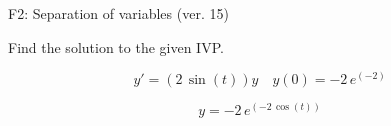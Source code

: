 \begin{exercise}
  \begin{exerciseTitle}F2: Separation of variables (ver. 15)\end{exerciseTitle}
  \begin{exerciseStatement}
    
Find the solution to the given IVP.

    
\[y'=( 2 \, \sin\left(t\right) )y\hspace{1em} y(0)= -2 \, e^{\left(-2\right)}\]

  \end{exerciseStatement}
  \begin{exerciseAnswer}
    
\[y= -2 \, e^{\left(-2 \, \cos\left(t\right)\right)}\]

  \end{exerciseAnswer}
\end{exercise}